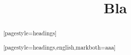 \documentclass[english,ngerman,cdfoot,automark,twoside=on,titlepage]{tudscrreprt}
\begin{document}
\title{Bla}
\maketitle

\begin{abstract}[pagestyle=headings]
\blindtext[25]
\end{abstract}

\begin{abstract}[pagestyle=headings,english,markboth=aaa]
\blindtext[25]
\end{abstract}
\tableofcontents

\blinddocument

%
%
%

%

%
%
%

\Blindtext\Blindtext

\Blinddocument
\end{document}
